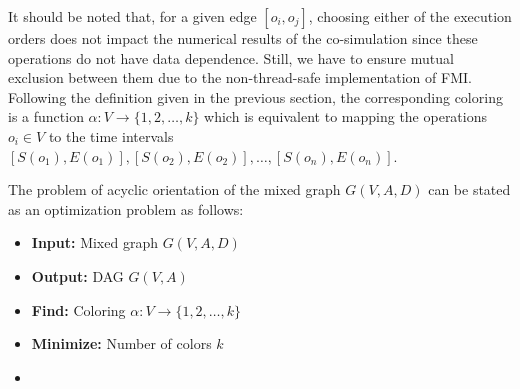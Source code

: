 It should be noted that, for a given edge $[o_i, o_j]$, choosing either of the execution orders does not impact the numerical results of the co-simulation since these operations do not have data dependence. Still, we have to ensure mutual exclusion between them due to the non-thread-safe implementation of FMI. Following the definition given in the previous section, the corresponding coloring is a function $\alpha: V \rightarrow \{1, 2, \ldots, k\}$ which is equivalent to mapping the operations $o_i \in V$ to the time intervals $[S(o_1), E(o_1)], [S(o_2), E(o_2)], \ldots, [S(o_n), E(o_n)]$.

The problem of acyclic orientation of the mixed graph $G(V,A,D)$ can be stated as an optimization problem as follows:

\begin{itemize}[label={},topsep=1pt,parsep=1pt,partopsep=1pt,leftmargin=*]	
\item \textbf{Input:} Mixed graph $G(V,A,D)$
\item \textbf{Output:} DAG $G(V,A)$
\item \textbf{Find:} Coloring $\alpha: V \rightarrow \{1, 2, \ldots, k\}$
\item \textbf{Minimize:} Number of colors $k$
\item {}
\end{itemize}

%

